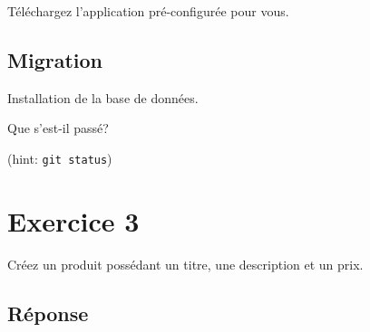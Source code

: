 Téléchargez l'application pré-configurée pour vous.

\begin{english}

\begin{Shaded}
\begin{Highlighting}[]
\NormalTok{$ }
\NormalTok{$ }

\NormalTok{$ }\KeywordTok{\textbackslash{}}
        \KeywordTok{\textbackslash{}}

\NormalTok{$ }
\NormalTok{$ }
\end{Highlighting}
\end{Shaded}

\end{english}

\hypertarget{migration}{%
\subsection{Migration}\label{migration}}

Installation de la base de données.

\begin{english}

\begin{Shaded}
\begin{Highlighting}[]
\NormalTok{$ }
\end{Highlighting}
\end{Shaded}

\end{english}

Que s'est-il passé?

(hint: \textenglish{\texttt{git\ status}})

\hypertarget{exercice-3}{%
\section{Exercice 3}\label{exercice-3}}

Créez un produit possédant un titre, une description et un prix.

\hypertarget{ruxe9ponse}{%
\subsection{Réponse}\label{ruxe9ponse}}

